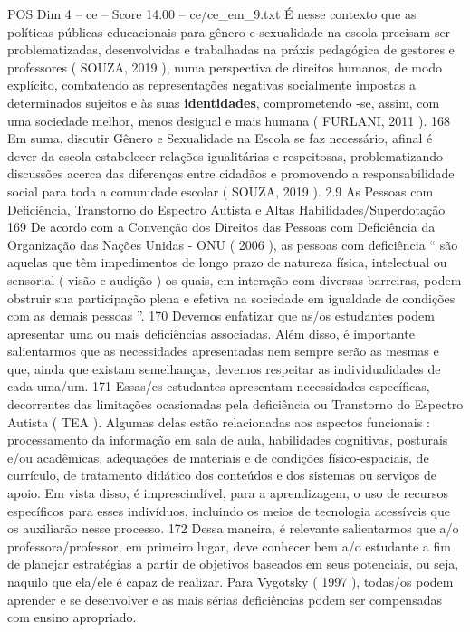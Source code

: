 \begin{textsample}{POS Dim 4 – ce – Score 14.00 – ce/ce\_em\_9.txt}
É nesse contexto que as políticas públicas educacionais para gênero e sexualidade na escola precisam ser problematizadas, desenvolvidas e trabalhadas na práxis pedagógica de gestores e professores ( SOUZA, 2019 ), numa perspectiva de direitos humanos, de modo explícito, combatendo as representações negativas socialmente impostas a determinados sujeitos e às suas \textbf{identidades}, comprometendo -se, assim, com uma sociedade melhor, menos desigual e mais humana ( FURLANI, 2011 ). 168 Em suma, discutir Gênero e Sexualidade na Escola se faz necessário, afinal é dever da escola estabelecer relações igualitárias e respeitosas, problematizando discussões acerca das diferenças entre cidadãos e promovendo a responsabilidade social para toda a comunidade escolar ( SOUZA, 2019 ). 2.9 As Pessoas com Deficiência, Transtorno do Espectro Autista e Altas Habilidades/Superdotação 169 De acordo com a Convenção dos Direitos das Pessoas com Deficiência da Organização das Nações Unidas - ONU ( 2006 ), as pessoas com deficiência “ são aquelas que têm impedimentos de longo prazo de natureza física, intelectual ou sensorial ( visão e audição ) os quais, em interação com diversas barreiras, podem obstruir sua participação plena e efetiva na sociedade em igualdade de condições com as demais pessoas ”. 170 Devemos enfatizar que as/os estudantes podem apresentar uma ou mais deficiências associadas.
Além disso, é importante salientarmos que as necessidades apresentadas nem sempre serão as mesmas e que, ainda que existam semelhanças, devemos respeitar as individualidades de cada uma/um. 171 Essas/es estudantes apresentam necessidades específicas, decorrentes das limitações ocasionadas pela deficiência ou Transtorno do Espectro Autista ( TEA ).
Algumas delas estão relacionadas aos aspectos funcionais : processamento da informação em sala de aula, habilidades cognitivas, posturais e/ou acadêmicas, adequações de materiais e de condições físico-espaciais, de currículo, de tratamento didático dos conteúdos e dos sistemas ou serviços de apoio.
Em vista disso, é imprescindível, para a aprendizagem, o uso de recursos específicos para esses indivíduos, incluindo os meios de tecnologia acessíveis que os auxiliarão nesse processo. 172 Dessa maneira, é relevante salientarmos que a/o professora/professor, em primeiro lugar, deve conhecer bem a/o estudante a fim de planejar estratégias a partir de objetivos baseados em seus potenciais, ou seja, naquilo que ela/ele é capaz de realizar.
Para Vygotsky ( 1997 ), todas/os podem aprender e se desenvolver e as mais sérias deficiências podem ser compensadas com ensino apropriado.

\end{textsample}
